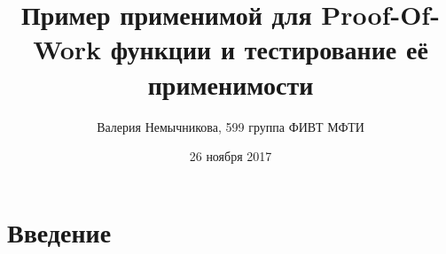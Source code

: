 \documentclass{article}
\title{Пример применимой для Proof-Of-Work функции и тестирование её применимости}
\date{26 ноября 2017}
\author{Валерия Немычникова, 599 группа ФИВТ МФТИ}
\begin{document}
\maketitle


\section{Введение}
\end{document}
